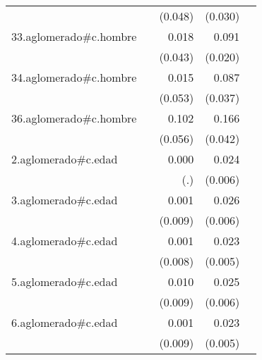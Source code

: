 {\begin{longtable}{l*{4}{D{.}{.}{-1}}}
            &                     &     (0.048)         &     (0.030)         &                     \\
\addlinespace
33.aglomerado#c.hombre&                     &       0.018         &       0.091\sym{***}&                     \\
            &                     &     (0.043)         &     (0.020)         &                     \\
\addlinespace
34.aglomerado#c.hombre&                     &       0.015         &       0.087\sym{*}  &                     \\
            &                     &     (0.053)         &     (0.037)         &                     \\
\addlinespace
36.aglomerado#c.hombre&                     &       0.102         &       0.166\sym{***}&                     \\
            &                     &     (0.056)         &     (0.042)         &                     \\
\addlinespace
2.aglomerado#c.edad&                     &       0.000         &       0.024\sym{***}&                     \\
            &                     &         (.)         &     (0.006)         &                     \\
\addlinespace
3.aglomerado#c.edad&                     &       0.001         &       0.026\sym{***}&                     \\
            &                     &     (0.009)         &     (0.006)         &                     \\
\addlinespace
4.aglomerado#c.edad&                     &       0.001         &       0.023\sym{***}&                     \\
            &                     &     (0.008)         &     (0.005)         &                     \\
\addlinespace
5.aglomerado#c.edad&                     &       0.010         &       0.025\sym{***}&                     \\
            &                     &     (0.009)         &     (0.006)         &                     \\
\addlinespace
6.aglomerado#c.edad&                     &       0.001         &       0.023\sym{***}&                     \\
            &                     &     (0.009)         &     (0.005)         &                     \\

\end{longtable}}
